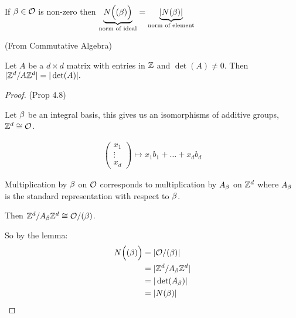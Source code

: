 \documentclass[11pt]{article}
\begin{document}
\begin{prop}
	If $\beta \in \mathcal{O}$ is non-zero then $\underbrace{N\Big((\beta)\Big)}_\text{norm of ideal}  = \underbrace{|N(\beta)|}_\text{norm of element}$
\end{prop}


\begin{lemma}
	(From Commutative Algebra)

	Let $A$ be a $d \times d$ matrix with entries in $\mathbb{Z}$ and $\det(A) \neq 0$.
	Then $| \mathbb{Z}^d /A\mathbb{Z}^d| = |\det(A)|.$
\end{lemma}

\begin{proof}
	(Prop 4.8)

	Let $\beta$ be an integral basis, this gives us an isomorphisms of additive groups, $\mathbb{Z}^d \cong \mathcal{O}$.

	\begin{align*}
		\begin{pmatrix}
x_1\\
\vdots\\
x_d
		\end{pmatrix} \mapsto x_1b_1 + \dots + x_db_d
	\end{align*}
	
	Multiplication by $\beta$ on $\mathcal{O}$ corresponds to multiplication by $A_\beta$ on $\mathbb{Z}^d$ where $A_\beta$ is the standard representation with respect to $\beta$.
\spa

	Then $\mathbb{Z}^d / A_\beta \mathbb{Z}^d \cong \mathcal{O} /(\beta)$.
\spa

	So by the lemma:
	\begin{align*}
	N\Big((\beta)\Big) & = |\mathcal{O}/ (\beta) |\\
		& = | \mathbb{Z}^d / A_\beta \mathbb{Z}^d|\\
		& = |\det(A_\beta) |\\
		& = |N(\beta)|
	\end{align*}
\end{proof}
\end{document}
